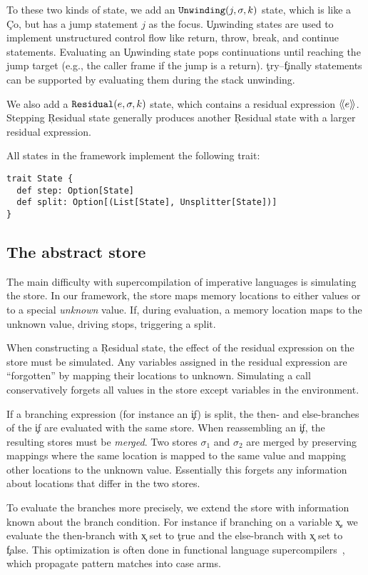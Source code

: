 To these two kinds of state, we add an
$\c{Unwinding}(j, \sigma, k)$ state, which is like a \c{Co}, but has a jump statement
$j$
as the focus. \c{Unwinding} states are used to implement unstructured control
flow like return, throw, break, and continue statements.
Evaluating an \c{Unwinding} state pops continuations until reaching
the jump target (e.g., the caller frame if the jump is a return).
\c{try}--\c{finally} statements can be supported by evaluating them during the
stack unwinding.

We also add a 
$\c{Residual}(e, \sigma, k)$ state, which contains 
a residual expression $\langle\!\langle e\rangle\!\rangle$. Stepping \c{Residual} state
generally produces another \c{Residual} state with a larger residual
expression.

All states in the framework implement the following trait:
\begin{verbatim}
trait State {
  def step: Option[State]
  def split: Option[(List[State], Unsplitter[State])]
}
\end{verbatim}


\subsection{The abstract store}

The main difficulty with supercompilation of imperative languages 
is simulating the store.
In our framework, 
the store maps memory locations to either values or 
to a special \emph{unknown} value.
If, during evaluation, a memory location maps to the unknown value,
driving stops, triggering a split.

When constructing a \c{Residual} state, the effect of the residual expression
on the store must be simulated. Any variables assigned in the
residual expression are ``forgotten'' by mapping their locations to unknown.
Simulating a call conservatively forgets all values in the store except variables
in the environment.

If a branching expression (for instance an \c{if}) is split,
the then- and else-branches of the \c{if} are evaluated with the same store.
When reassembling an \c{if}, the resulting stores must be \emph{merged}.
Two stores $\sigma_1$ and $\sigma_2$ are merged by preserving mappings where the same location
is mapped to the same value and mapping other locations to the unknown value.
Essentially this forgets any information about locations that differ in the
two stores.

To evaluate the branches more precisely, we extend the store
with information known about the branch condition.
For instance if branching on a variable \c{x}, we evaluate the then-branch with \c{x} set to \c{true} and the
else-branch with \c{x} set to \c{false}.
This optimization is often done in functional language
supercompilers~\cite{supercompilation-by-eval,mitchell-supero},
which propagate pattern matches into case arms.

